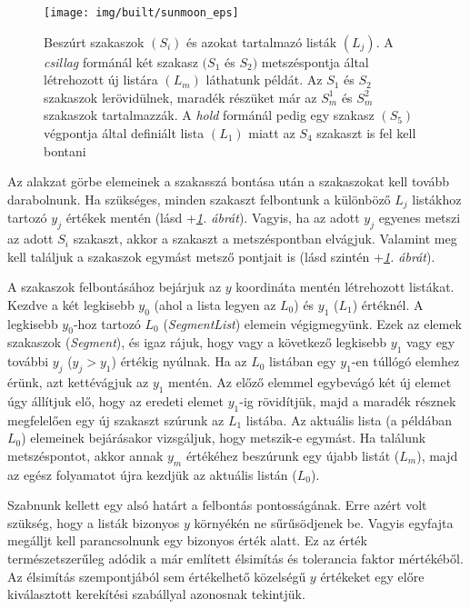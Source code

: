 \documentclass[12pt]{report}
\theoremstyle{definition}
\newcommand{\func}[1]{{\textsl{#1}}}
\begin{document}
  \begin{figure}
    \centering \texttt{[image: img/built/sunmoon\_eps]}
    \caption{\label{fig:sunmoon} Beszúrt
    szakaszok $(S_i)$ és azokat tartalmazó listák $(L_j)$. A \emph{csillag}
    formánál két szakasz $(S_1$ és $S_2)$ metszéspontja által létrehozott új
    listára $(L_m)$ láthatunk példát. Az $S_1$ és $S_2$ szakaszok
    lerövidülnek, maradék részüket már az $S_m^1$ és $S_m^2$ szakaszok
    tartalmazzák. A \emph{hold} formánál pedig egy szakasz $(S_5)$
    végpontja által definiált lista $(L_1)$ miatt az $S_4$ szakaszt is fel
    kell bontani}
  \end{figure}

Az alakzat görbe elemeinek a szakasszá bontása után a szakaszokat kell tovább
darabolnunk. Ha szükséges, minden szakaszt felbontunk a különböző $L_j$
listákhoz tartozó $y_j$ értékek mentén (lásd \az+\emph{\ref{fig:sunmoon}.
ábrát}). Vagyis, ha az adott $y_j$ egyenes metszi az adott $S_i$ szakaszt,
akkor a szakaszt a metszéspontban elvágjuk. Valamint meg kell találjuk a
szakaszok egymást metsző pontjait is (lásd szintén \az+\emph{\ref{fig:sunmoon}.
ábrát}).

A szakaszok felbontásához bejárjuk az $y$ koordináta mentén létrehozott
listákat. Kezdve a két legkisebb $y_0$ (ahol a lista legyen az $L_0$) és $y_1$
($L_1$) értéknél. A legkisebb $y_0$-hoz tartozó $L_0$ (\func{SegmentList})
elemein végigmegyünk. Ezek az elemek szakaszok (\func{Segment}), és igaz rájuk,
hogy vagy a következő legkisebb $y_1$ vagy egy további $y_j$ ($y_j > y_1$)
értékig nyúlnak. Ha az $L_0$ listában egy $y_1$-en túllógó elemhez érünk, azt
kettévágjuk az $y_1$ mentén. Az előző elemmel egybevágó két új elemet úgy
állítjuk elő, hogy az eredeti elemet $y_1$-ig rövidítjük, majd a maradék
résznek megfelelően egy új szakaszt szúrunk az $L_1$ listába. Az aktuális lista
(a példában $L_0$) elemeinek bejárásakor vizsgáljuk, hogy metszik-e egymást. Ha
találunk metszéspontot, akkor annak $y_m$ értékéhez beszúrunk egy újabb listát
($L_m$), majd az egész folyamatot újra kezdjük az aktuális listán ($L_0$).

Szabnunk kellett egy alsó határt a felbontás pontosságának. Erre azért volt
szükség, hogy a listák bizonyos $y$ környékén ne sűrűsödjenek be. Vagyis
egyfajta megálljt kell parancsolnunk egy bizonyos érték alatt. Ez az érték
természetszerűleg adódik a már említett élsimítás és tolerancia faktor
mértékéből. Az élsimítás szempontjából sem értékelhető közelségű $y$ értékeket
egy előre kiválasztott kerekítési szabállyal azonosnak tekintjük.
\end{document}
